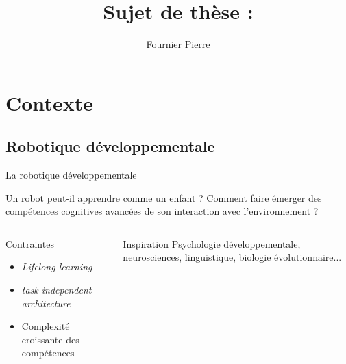 \documentclass[xcolor=pst,dvips,12pt,english,french]{beamer}
\title{Sujet de thèse :}
\author{Fournier Pierre}
\begin{document}
	\frame{\titlepage} 
	
	
	\section{Contexte}
	
	\subsection{Robotique développementale}
	
	\begin{frame}{La robotique développementale}
		\begin{block}{Un robot peut-il apprendre comme un enfant ?}
			 Comment faire émerger des compétences cognitives avancées de son interaction avec l'environnement ?
		\end{block}
		\begin{columns}
			\begin{column}{0.45\textwidth}
				\begin{exampleblock}{Contraintes}
					\begin{itemize}
						\item \emph{Lifelong learning}
						\item \emph{task-independent architecture}
						\item Complexité croissante des compétences
					\end{itemize}
				\end{exampleblock}
			\end{column}
			\begin{column}{0.45\textwidth}
				\begin{exampleblock}{Inspiration}
					Psychologie développementale, neurosciences, linguistique, biologie évolutionnaire...
				\end{exampleblock}
			\end{column}
		\end{columns}
	\end{frame}
	
\end{document}
